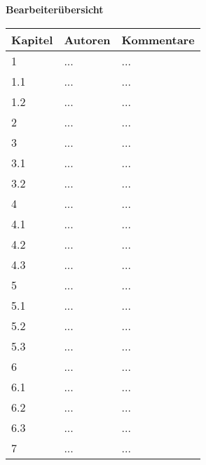 
\newcommand{\dokumentTitel}{Pflichtenheft}





{\textbf{Bearbeiterübersicht}}\\[2ex]
\begin{longtable}{|m{3.38cm}|m{4.0cm}|m{6.0cm}|}
  \hline                                              %
  \textbf{Kapitel}  &    \textbf{Autoren}  &    \textbf{Kommentare} \\ 
  \hline \hline                                       %
  
  1   &    ...    &    ...  \\ \hline
  1.1 &    ...    &    ...  \\ \hline
  1.2 &    ...    &    ...  \\ \hline
  2   &    ...    &    ...  \\ \hline
  3   &    ...    &    ...  \\ \hline
  3.1 &    ...    &    ...  \\ \hline
  3.2 &    ...    &    ...  \\ \hline
  4   &    ...    &    ...  \\ \hline
  4.1 &    ...    &    ...  \\ \hline
  4.2 &    ...    &    ...  \\ \hline
  4.3 &    ...    &    ...  \\ \hline
  5   &    ...    &    ...  \\ \hline
  5.1 &    ...    &    ...  \\ \hline
  5.2 &    ...    &    ...  \\ \hline
  5.3 &    ...    &    ...  \\ \hline
  6   &    ...    &    ...  \\ \hline
  6.1 &    ...    &    ...  \\ \hline
  6.2 &    ...    &    ...  \\ \hline
  6.3 &    ...    &    ...  \\ \hline
  7   &    ...    &    ...  \\ \hline
\end{longtable}

